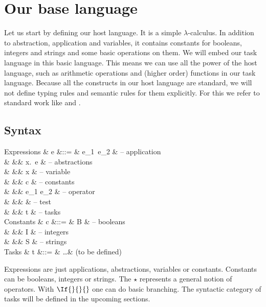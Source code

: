 
\section{Our base language}

Let us start by defining our host language.
It is a simple $\lambda$-calculus.
In addition to abstraction, application and variables,
it contains constants for booleans, integers and strings
and some basic operations on them.
We will embed our task language in this basic language.
This means we can use all the power of the host language,
such as arithmetic operations and (higher order) functions in our task language.
Because all the constructs in our host language are standard,
we will not define typing rules and semantic rules for them explicitly.
For this we refer to standard work like \textcite{pierce2002types} and \textcite{harper2016practical}.


\subsection{Syntax}

\begin{grammar}
  Expressions
    & e &::= & e_1\ e_2           & – application \\
    &   &\mid& \lambda x.\ e      & – abstractions \\
    &   &\mid& x                  & – variable \\
    &   &\mid& c                  & – constants \\
    &   &\mid& e_1 \star e_2      & – operator \\
    &   &\mid&  & – test \\
    &   &\mid& t                  & – tasks \\
  Constants
    & c &::= & B                  & – booleans \\
    &   &\mid& I                  & – integers \\
    &   &\mid& S                  & – strings \\
  Tasks
    & t &::= & \ldots             & (to be defined) \\
\end{grammar}
Expressions are just applications, abstractions, variables or constants.
Constants can be booleans, integers or strings.
The $\star$ represents a general notion of operators.
With $\If{}{}{}$ one can do basic branching.
The syntactic category of tasks will be defined in the upcoming sections.

